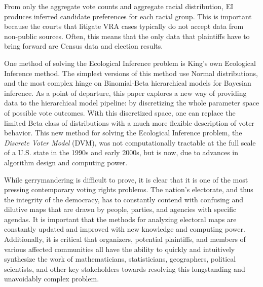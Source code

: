 From only the aggregate vote counts and aggregate racial distribution, EI produces inferred candidate preferences for each racial group. This is important because the courts that litigate VRA cases typically do not accept data from non-public sources. Often, this means that the only data that plaintiffs have to bring forward are Census data and election results.

One method of solving the Ecological Inference problem is King's own Ecological Inference method. The simplest versions of this method use Normal distributions, and the most complex hinge on Binomial-Beta hierarchical models for Bayesian inference. As a point of departure, this paper explores a new way of providing data to the hierarchical model pipeline: by discretizing the whole parameter space of possible vote outcomes. With this discretized space, one can replace the limited Beta class of distributions with a much more flexible description of voter behavior. This new method for solving the Ecological Inference problem, the \textit{Discrete Voter Model} (DVM), was not computationally tractable at the full scale of a U.S. state in the 1990s and early 2000s, but is now, due to advances in algorithm design and computing power.

While gerrymandering is difficult to prove, it is clear that it is one of the most pressing contemporary voting rights problems. The nation’s electorate, and thus the integrity of the democracy, has to constantly contend with confusing and dilutive maps that are drawn by people, parties, and agencies with specific agendas. It is important that the methods for analyzing electoral maps are constantly updated and improved with new knowledge and computing power. Additionally, it is critical that organizers, potential plaintiffs, and members of various affected communities all have the ability to quickly and intuitively synthesize the work of mathematicians, statisticians, geographers, political scientists, and other key stakeholders towards resolving this longstanding and unavoidably complex problem.
